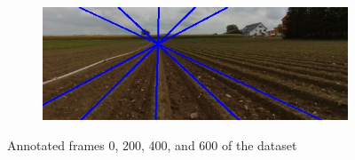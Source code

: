 \begin{figure}
\begin{subfigure}{0.49\textwidth}
    \label{fig:first}
\end{subfigure}
\begin{subfigure}{0.49\textwidth}
    \includegraphics[width=\textwidth]{Report/images/rgb600.jpg}
    \label{fig:first}
\end{subfigure}
\caption{Annotated frames 0, 200, 400, and 600 of the dataset}
\end{figure}
